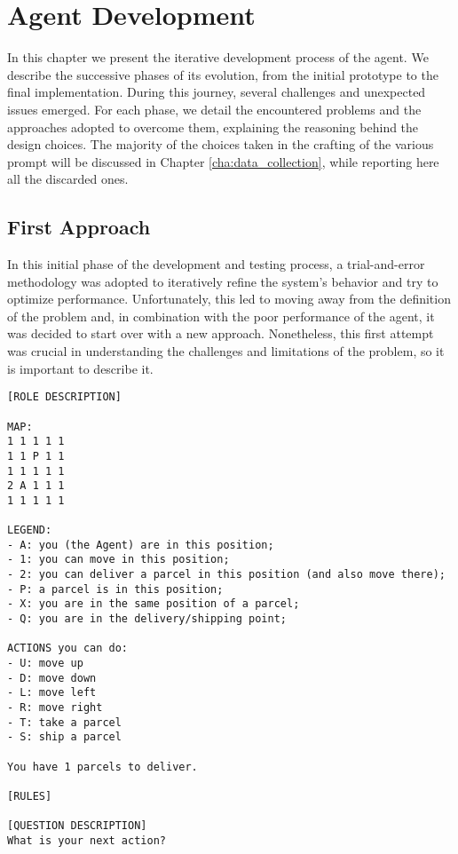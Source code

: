 \chapter{Agent Development}
\label{cha:agent_development}

In this chapter we present the iterative development process of the agent. We describe
the successive phases of its evolution, from the initial prototype to the final
implementation. During this journey, several challenges and unexpected issues
emerged. For each phase, we detail the encountered problems and the approaches
adopted to overcome them, explaining the reasoning behind the design choices.
The majority of the choices taken in the crafting of the various prompt will be
discussed in Chapter \ref{cha:data_collection}, while reporting here all the discarded
ones.

\section{First Approach}
\label{sec:first_approach}

In this initial phase of the development and testing process, a trial-and-error methodology
was adopted to iteratively refine the system's behavior and try to optimize performance.
Unfortunately, this led to moving away from the definition of the problem and,
in combination with the poor performance of the agent, it was decided to start over
with a new approach. Nonetheless, this first attempt was crucial in understanding
the challenges and limitations of the problem, so it is important to describe it.

\vspace{1mm}
\begin{codewindow}
  [Prompt]  \begin{lstlisting}
[ROLE DESCRIPTION]

MAP:
1 1 1 1 1
1 1 P 1 1
1 1 1 1 1
2 A 1 1 1
1 1 1 1 1

LEGEND:
- A: you (the Agent) are in this position;
- 1: you can move in this position;
- 2: you can deliver a parcel in this position (and also move there);
- P: a parcel is in this position;
- X: you are in the same position of a parcel;
- Q: you are in the delivery/shipping point;

ACTIONS you can do:
- U: move up
- D: move down
- L: move left
- R: move right
- T: take a parcel
- S: ship a parcel

You have 1 parcels to deliver.

[RULES]

[QUESTION DESCRIPTION]
What is your next action?
\end{lstlisting}
\end{codewindow}
\vspace{1mm}

